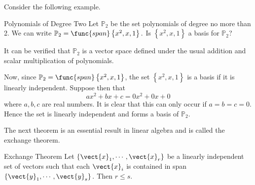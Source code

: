 Consider the following example.

\begin{example}{Polynomials of Degree Two}\label{exa:polydegreetwo}
Let $\mathbb{P}_2$ be the set polynomials of degree no more than 2. We can write
$\mathbb{P}_2=\func{span}\left\{ x^{2}, x, 1\right\} .$ Is $\left\{ x^{2}, x, 1\right\} $ a
basis for $\mathbb{P}_2$?
\end{example}

\begin{solution}
It can be verified that $\mathbb{P}_2$ is a vector space defined under the usual addition and scalar multiplication of polynomials. 

Now, since $\mathbb{P}_2=\func{span}\left\{ x^{2},x, 1\right\}$, the set  $\left\{ x^{2}, x, 1\right\} $ is a basis if it is linearly independent. Suppose then that 
\begin{equation*}
ax^{2}+bx+c=0x^2 + 0x + 0 
\end{equation*}
where $a,b,c$ are real numbers. It is clear that this can only occur if $a=b=c=0$. Hence the set is linearly independent and forms a basis of $\mathbb{P}_2$.
\end{solution}

The next theorem is an essential result in linear algebra and is called the exchange theorem. 

\begin{theorem}{Exchange Theorem}\label{thm:exchangetheorem}
Let $\left\{ \vect{x}_{1},\cdots ,\vect{x}_{r}\right\} $
be a linearly independent set of vectors such that each $\vect{x}_{i}$ is
contained in span$\left\{ \vect{y}_{1},\cdots ,\vect{y}_{s}\right\} .$ Then $
r\leq s.$
\end{theorem}

